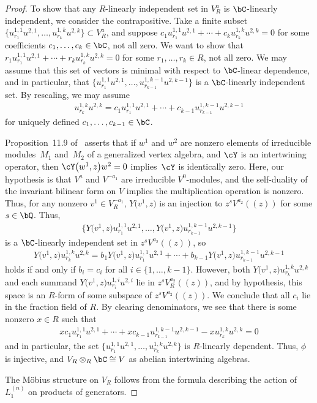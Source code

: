 \begin{proof}
To show that any $R$-linearly independent set in $V^a_R$ is $\bC$-linearly independent, we consider the contrapositive. Take a finite subset $\big\{ u^{1,1}_{r_1}u^{2,1},\ldots, u^{1,k}_{r_k} u^{2,k} \big\} \subset V^a_R$, and suppose $c_1 u^{1,1}_{r_1}u^{2,1} + \cdots + c_k u^{1,k}_{r_k} u^{2,k} = 0$ for some coefficients $c_1,\ldots,c_k \in \bC$, not all zero. We want to show that $r_1 u^{1,1}_{r_1}u^{2,1} + \cdots + r_k u^{1,k}_{r_k} u^{2,k} = 0$ for some $r_1,\ldots,r_k \in R$, not all zero. We may assume that this set of vectors is minimal with respect to $\bC$-linear dependence, and in particular, that $\big\{ u^{1,1}_{r_1}u^{2,1},\ldots, u^{1,k-1}_{r_{k-1}} u^{2,k-1} \big\}$ is a $\bC$-linearly independent set. By rescaling, we may assume
\begin{gather*} u^{1,k}_{r_k} u^{2,k} = c_1 u^{1,1}_{r_1}u^{2,1} + \cdots + c_{k-1} u^{1,k-1}_{r_{k-1}} u^{2,k-1} \end{gather*}
for uniquely defined $c_1,\ldots, c_{k-1} \in \bC$.

Proposition~11.9 of~\cite{DL93} asserts that if $w^1$ and $w^2$ are nonzero elements of irreducible mo\-dules~$M_1$ and~$M_2$ of a generalized vertex algebra, and $\cY$ is an intertwining operator, then $\cY\big(w^1,z\big)w^2 = 0$ implies~$\cY$ is identically zero. Here, our hypothesis is that $V^a$ and $V^{-a_1}$ are irreducible $V^0$-modules, and the self-duality of the invariant bilinear form on $V$ implies the multiplication operation is nonzero. Thus, for any nonzero $v^1 \in V^{-a_1}_R$, $Y\big(v^1,z\big)$ is an injection to $z^s V^{a_2}((z))$ for some $s \in \bQ$. Thus,
\begin{gather*} \big\{ Y\big(v^1,z\big) u^{1,1}_{r_1}u^{2,1}, \ldots, Y\big(v^1,z\big) u^{1,k-1}_{r_{k-1}} u^{2,k-1} \big\} \end{gather*}
is a $\bC$-linearly independent set in $z^s V^{a_2}((z))$, so
\begin{gather*} Y\big(v^1,z\big) u^{1,k}_{r_k} u^{2,k} = b_1 Y\big(v^1,z\big) u^{1,1}_{r_1}u^{2,1} + \cdots + b_{k-1} Y\big(v^1,z\big) u^{1,k-1}_{r_{k-1}} u^{2,k-1} \end{gather*}
holds if and only if $b_i = c_i$ for all $i \in \{1,\ldots,k-1\}$. However, both $Y\big(v^1,z\big) u^{1,k}_{r_k} u^{2,k}$ and each summand $Y\big(v^1,z\big) u^{1,i}_{r_i}u^{2,i}$ lie in $z^sV^{a_2}_R((z))$, and by hypothesis, this space is an $R$-form of some subspace of $z^sV^{a_2}((z))$. We conclude that all $c_i$ lie in the fraction field of $R$. By clearing denominators, we see that there is some nonzero $x \in R$ such that
\begin{gather*} xc_1 u^{1,1}_{r_1}u^{2,1} + \cdots + xc_{k-1} u^{1,k-1}_{r_{k-1}} u^{2,k-1} - x u^{1,k}_{r_k} u^{2,k} = 0 \end{gather*}
and in particular, the set $\big\{ u^{1,1}_{r_1}u^{2,1},\ldots, u^{1,k}_{r_k} u^{2,k} \big\}$ is $R$-linearly dependent. Thus, $\phi$ is injective, and $V_R \otimes_{R} \bC \cong V$ as abelian intertwining algebras.

The M\"obius structure on $V_R$ follows from the formula describing the action of $L_1^{(n)}$ on products of generators.
\end{proof}

